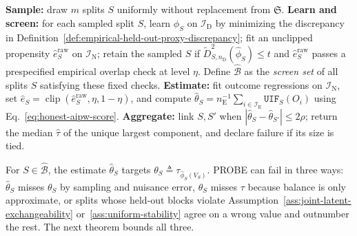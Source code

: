 \begin{algorithm}[!h]
\caption{PROBE split search}\label{alg:probe-search}
\textbf{Sample:} draw $m$ splits $S$ uniformly without replacement from $\mathfrak S$.\;
\textbf{Learn and screen:} for each sampled split $S$, learn $\widehat\phi_S$ on $\mathcal I_{\mathrm D}$ by minimizing the discrepancy in Definition~\ref{def:empirical-held-out-proxy-discrepancy}; fit an unclipped propensity $\widehat e_S^{\mathrm{raw}}$ on $\mathcal I_{\mathrm N}$; retain the sampled $S$ if $\widetilde D_{S,n_{\mathrm D}}^2(\widehat\phi_S)\le t$ and $\widehat e_S^{\mathrm{raw}}$ passes a prespecified empirical overlap check at level $\eta$. Define $\widehat{\mathcal B}$ as the \emph{screen set} of all splits $S$ satisfying these fixed checks.\;
\textbf{Estimate:} fit outcome regressions on $\mathcal I_{\mathrm N}$, set $\widehat e_S=\operatorname{clip}(\widehat e_S^{\mathrm{raw}},\eta,1-\eta)$, and compute $\widehat\theta_S=n_{\mathrm E}^{-1}\sum_{i\in\mathcal I_{\mathrm E}}\mathtt{UIF}_S(O_i)$ using Eq.~\eqref{eq:honest-aipw-score}.\;
\textbf{Aggregate:} link $S,S'$ when $|\widehat\theta_S-\widehat\theta_{S'}|\le2\rho$; return the median $\widehat\tau$ of the unique largest component, and declare failure if its size is tied.\;
\end{algorithm}

For $S\in\widehat{\mathcal B}$, the estimate $\widehat\theta_S$ targets $\theta_S\triangleq\tau_{\widehat\phi_S(V_S)}$. PROBE can fail in three ways: $\widehat\theta_S$ misses $\theta_S$ by sampling and nuisance error, $\theta_S$ misses $\tau$ because balance is only approximate, or splits whose held-out blocks violate Assumption~\ref{ass:joint-latent-exchangeability} or~\ref{ass:uniform-stability} agree on a wrong value and outnumber the rest. The next theorem bounds all three.

